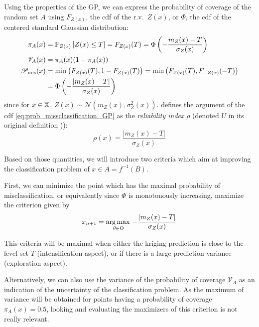 \documentclass[../../Main_ManuscritThese.tex]{subfiles}
\begin{document}
Using the properties of the GP, we can express the probability of
coverage of the random set $A$ using $F_{Z(x)}$, the cdf of the r.v.\
$Z(x)$, or $\Phi$, the cdf of the centered standard Gaussian
distribution:
\begin{align}
  \pi_A(x) &= \mathbb{P}_{Z(x)}\left[Z(x) \leq T\right] = F_{Z(x)}(T)=\Phi\left(-\frac{m_Z(x) - T}{\sigma_Z(x)}\right) \\
  \mathscr{V}_A(x) &= \pi_A(x)(1 - \pi_A(x)) \\
  \mathscr{P}_{\mathrm{mis}}(x) &= \min\left(F_{Z(x)}(T), 1-F_{Z(x)}(T)\right)=\min\left(F_{Z(x)}(T),F_{-Z(x)}(-T)\right) \\
           &= \Phi\left(- \frac{\lvert m_Z(x) - T \rvert}{\sigma_Z(x)} \right) \label{eq:prob_missclassification_GP}
\end{align}
since for $x\in\mathbb{X}$, $Z(x)\sim\mathcal{N}\left(m_Z(x), \sigma^2_Z(x)\right)$.
\cite{echard_ak-mcs_2011} defines the argument of the cdf \cref{eq:prob_missclassification_GP} as the \emph{reliability index} $\rho$ (denoted $U$ in its original definition \cite{echard_ak-mcs_2011})):
\begin{equation}
  \rho(x) = \frac{\lvert m_Z(x) - T \rvert}{\sigma_Z(x)}
\end{equation}

Based on those quantities, we will introduce two criteria which aim at
improving the classification problem of $x\in A=f^{-1}(B)$.

First, we can minimize the point which has the maximal probability of
misclassification, or equivalently since $\Phi$ is monotonously
increasing, maximize the criterion given by
\begin{equation}
  x_{n+1} =\operatorname*{arg\,max \,}_{\theta\in\Theta} -\frac{\lvert m_Z(x) - T \rvert}{\sigma_Z(x)}
\end{equation}

This criteria will be maximal when either the kriging prediction is
close to the level set $T$ (intensification aspect), or if there is a
large prediction variance (exploration aspect).


Alternatively, we can also use the variance of the probability of coverage $\mathscr{V}_A$ as an indication of the uncertainty of the classification problem. As the maximum of variance will be obtained for points having a probability of coverage $\pi_A(x) =0.5$, looking and evaluating the maximizers of this criterion is not really relevant.
\end{document}
